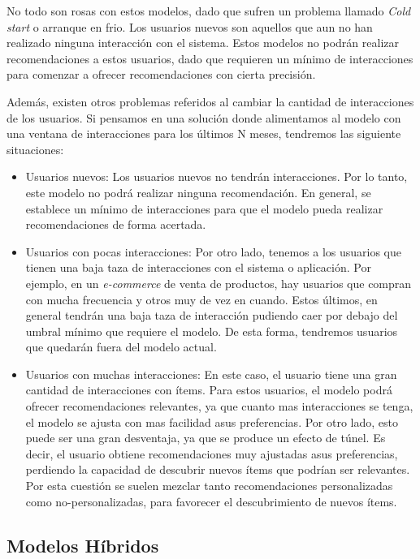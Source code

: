 \documentclass[11pt,a4paper,twoside]{thesis}
\begin{document}
No todo son rosas con estos modelos, dado que sufren un problema llamado
\textit{Cold start} o arranque en frio. Los usuarios nuevos son aquellos que
aun no han realizado ninguna interacción con el sistema. Estos modelos no
podrán realizar recomendaciones a estos usuarios, dado que requieren un mínimo
de interacciones para comenzar a ofrecer recomendaciones con cierta precisión.

Además, existen otros problemas referidos al cambiar la cantidad de
interacciones de los usuarios. Si pensamos en una solución donde alimentamos al
modelo con una ventana de interacciones para los últimos N meses, tendremos las
siguiente situaciones:

\begin{itemize}
	\item Usuarios nuevos: Los usuarios nuevos no tendrán interacciones. Por lo tanto,
	      este modelo no podrá realizar ninguna recomendación. En general, se establece
	      un mínimo de interacciones para que el modelo pueda realizar recomendaciones de
	      forma acertada.
	\item Usuarios con pocas interacciones: Por otro lado, tenemos a los usuarios que
	      tienen una baja taza de interacciones con el sistema o aplicación. Por ejemplo,
	      en un \textit{e-commerce} de venta de productos, hay usuarios que compran con
	      mucha frecuencia y otros muy de vez en cuando. Estos últimos, en general
	      tendrán una baja taza de interacción pudiendo caer por debajo del umbral mínimo
	      que requiere el modelo. De esta forma, tendremos usuarios que quedarán fuera
	      del modelo actual.
	\item Usuarios con muchas interacciones: En este caso, el usuario tiene una gran
	      cantidad de interacciones con ítems. Para estos usuarios, el modelo podrá
	      ofrecer recomendaciones relevantes, ya que cuanto mas interacciones se tenga,
	      el modelo se ajusta con mas facilidad asus preferencias. Por otro lado, esto
	      puede ser una gran desventaja, ya que se produce un efecto de túnel. Es decir,
	      el usuario obtiene recomendaciones muy ajustadas asus preferencias, perdiendo
	      la capacidad de descubrir nuevos ítems que podrían ser relevantes. Por esta
	      cuestión se suelen mezclar tanto recomendaciones personalizadas como
	      no-personalizadas, para favorecer el descubrimiento de nuevos ítems.

\end{itemize}

\clearpage
\subsection{Modelos Híbridos}
\end{document}
